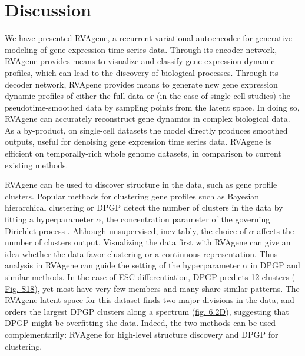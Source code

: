 %


\section{Discussion}
{We have presented RVAgene, a recurrent variational autoencoder for generative modeling of gene expression time series data.
Through its encoder network, RVAgene provides means to visualize and classify gene expression dynamic profiles, which can lead to the discovery of biological processes.
Through its decoder network, RVAgene provides means to generate new gene expression dynamic profiles of either the full data or (in the case of single-cell studies) the pseudotime-smoothed data by sampling points from the latent space. In doing so, RVAgene can accurately reconstruct gene dynamics in complex biological data. As a by-product, on single-cell datasets the model directly produces smoothed outputs, useful for denoising gene expression time series data. RVAgene is efficient on temporally-rich whole genome datasets, in comparison to current existing methods. }
\par
RVAgene can be used to discover structure in the data, such as gene profile clusters. Popular
methods for clustering gene profiles such as Bayesian hierarchical clustering
\citep{cooke2011bayesian} or DPGP \citep{McDowell2018} detect the number of clusters in the data by
fitting a hyperparameter $\alpha$, the concentration parameter of the governing Dirichlet process
\citep{ferguson1973bayesian}. Although unsupervised, inevitably, the choice of $\alpha$ affects the
number of clusters output. Visualizing the data first with RVAgene can give an idea whether the data
favor clustering or a continuous representation. Thus analysis in RVAgene can guide the setting of
the hyperparameter $\alpha$ in DPGP and similar methods. In the case of ESC differentiation, DPGP
predicts 12 clusters (\hyperref[fig:figS3]{ Fig. S18}), yet most have very few members and many share
similar patterns. The RVAgene latent space for this dataset finds two major divisions in the data,
and orders the largest DPGP clusters along a spectrum (\hyperref[fig:fig3]{fig. 6.2D}), suggesting that DPGP might be overfitting the data. Indeed, the two methods can be used complementarily: RVAgene for high-level structure discovery and DPGP for clustering.
